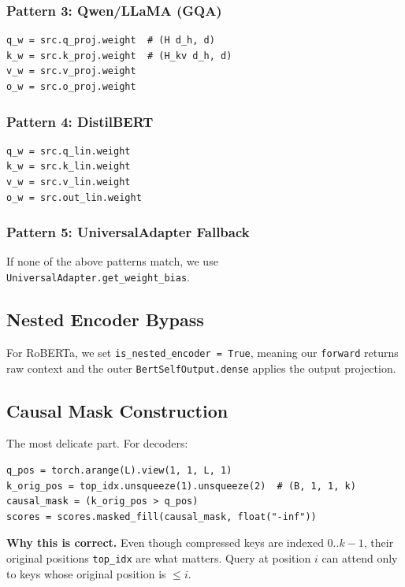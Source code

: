 \subsubsection{Pattern 3: Qwen/LLaMA (GQA)}

\begin{lstlisting}
q_w = src.q_proj.weight  # (H d_h, d)
k_w = src.k_proj.weight  # (H_kv d_h, d)
v_w = src.v_proj.weight
o_w = src.o_proj.weight
\end{lstlisting}

\subsubsection{Pattern 4: DistilBERT}

\begin{lstlisting}
q_w = src.q_lin.weight
k_w = src.k_lin.weight
v_w = src.v_lin.weight
o_w = src.out_lin.weight
\end{lstlisting}

\subsubsection{Pattern 5: UniversalAdapter Fallback}

If none of the above patterns match, we use \texttt{UniversalAdapter.get\_weight\_bias}.

\subsection{Nested Encoder Bypass}

For RoBERTa, we set \texttt{is\_nested\_encoder = True}, meaning our \texttt{forward} returns 
raw context and the outer \texttt{BertSelfOutput.dense} applies the output projection.

\subsection{Causal Mask Construction}

The most delicate part. For decoders:

\begin{lstlisting}
q_pos = torch.arange(L).view(1, 1, L, 1)
k_orig_pos = top_idx.unsqueeze(1).unsqueeze(2)  # (B, 1, 1, k)
causal_mask = (k_orig_pos > q_pos)
scores = scores.masked_fill(causal_mask, float("-inf"))
\end{lstlisting}

\textbf{Why this is correct.} Even though compressed keys are indexed $0..k-1$, 
their original positions \texttt{top\_idx} are what matters. Query at position $i$ 
can attend only to keys whose original position is $\leq i$.

